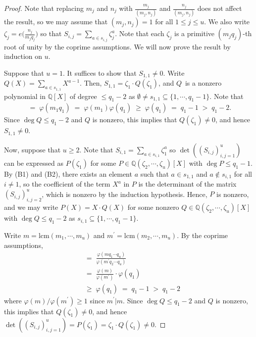 \documentclass[11pt]{amsart}
\theoremstyle{remark}
\newcommand{\rat}{\mathbb{Q}}
\newcommand{\vphi}{\varphi}
\newcommand{\eq}{\;=\;}
\newcommand{\lcm}{\mathrm{lcm}}
\begin{document}
\begin{proof}
Note that replacing $m_j$ and $n_j$ with $\frac{m_j}{(m_j,n_j)}$ and $\frac{n_j}{(m_j,n_j)}$ does not affect the result, so we may assume that $(m_j,n_j)=1$ for all $1\leq j\leq u$. We also write $\zeta_j=e\big(\tfrac{n_j}{m_jq_j}\big)$ so that $S_{i,j}=\sum_{a\in s_{i,j}}\zeta_j^a$. Note that each $\zeta_j$ is a primitive $(m_jq_j)$-th root of unity by the coprime assumptions. We will now prove the result by induction on $u$.

Suppose that $u=1$. It suffices to show that $S_{1,1}\neq 0$. Write $Q(X)=\sum_{a\in s_{1,1}}X^{a-1}$. Then, $S_{1,1}=\zeta_1\cdot Q(\zeta_1)$, and $Q$~is a nonzero polynomial in $\rat[X]$ of degree $\leq q_1-2$ as \mbox{$\emptyset\neq s_{1,1}\subseteq\{1,\cdots,q_1-1\}$}. Note that
\begin{align*}
    [\rat(\zeta_1):\rat]\eq\vphi(m_1q_1)\eq\vphi(m_1)\vphi(q_1)\;\geq\;\vphi(q_1)\eq q_1-1\;>\;q_1-2.
\end{align*}
Since $\deg Q\leq q_1-2$ and $Q$ is nonzero, this implies that $Q(\zeta_1)\neq 0$, and hence $S_{1,1}\neq 0$.

Now, suppose that $u\geq 2$. Note that $S_{i,1}=\sum_{a\in s_{i,1}}\zeta_1^a$ so $\det((S_{i,j})_{i,j=1}^u)$ can be expressed as $P(\zeta_1)$ for some $P\in\rat(\zeta_2,\cdots,\zeta_u)[X]$ with $\deg P\leq q_1-1$. By (B1) and (B2), there exists an element $a$ such that $a\in s_{1,1}$ and $a\notin s_{i,1}$ for all $i\neq 1$, so the coefficient of the term $X^a$ in $P$ is the determinant of the matrix $(S_{i,j})_{i,j=2}^u$, which is nonzero by the induction hypothesis. Hence, $P$ is nonzero, and we may write $P(X)=X\cdot Q(X)$ for some nonzero $Q\in\rat(\zeta_2,\cdots,\zeta_u)[X]$ with $\deg Q\leq q_1-2$ as $s_{i,1}\subseteq\{1,\cdots,q_1-1\}$.

Write $m=\lcm(m_1,\cdots,m_u)$ and \mbox{$m^\prime=\lcm(m_2,\cdots,m_u)$}. By the coprime assumptions, 
\begin{align*}
    [\rat(\zeta_1,\cdots,\zeta_u):\rat(\zeta_2,\cdots,\zeta_u)]&\eq\frac{\vphi(mq_1\cdots q_u)}{\vphi(m^\prime q_2\cdots q_u)} \\
    &\eq \frac{\vphi(m)}{\vphi(m^\prime)}\cdot\vphi(q_1)\\
    &\;\geq\;\vphi(q_1)\eq q_1-1\;>\;q_1-2
\end{align*}
where $\vphi(m)/\vphi(m^\prime)\geq 1$ since $m^\prime|m$. Since $\deg Q\leq q_1-2$ and $Q$ is nonzero, this implies that $Q(\zeta_1)\neq 0$, and hence $\det((S_{i,j})_{i,j=1}^u)=P(\zeta_1)=\zeta_1\cdot Q(\zeta_1)\neq 0$.
\end{proof}
\end{document}
